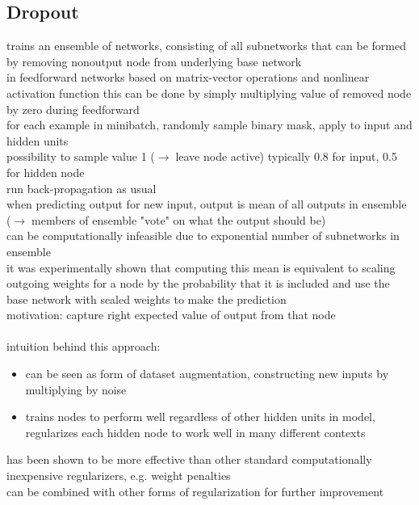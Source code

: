 \documentclass{article}
\newcommand{\arrow}{$\rightarrow\;$}
\begin{document}
\subsection{Dropout}
trains an ensemble of networks, consisting of all subnetworks that can be formed by removing nonoutput node from underlying base network \\
in feedforward networks based on matrix-vector operations and nonlinear activation function this can be done by simply multiplying value of removed node by zero during feedforward \\
for each example in minibatch, randomly sample binary mask, apply to input and hidden units \\
possibility to sample value 1 (\arrow leave node active) typically 0.8 for input, 0.5 for hidden node \\
run back-propagation as usual \\
when predicting output for new input, output is mean of all outputs in ensemble (\arrow members of ensemble "vote" on what the output should be) \\
can be computationally infeasible due to exponential number of subnetworks in ensemble \\
it was experimentally shown that computing this mean is equivalent to scaling outgoing weights for a node by the probability that it is included and use the base network with scaled weights to make the prediction \\
motivation: capture right expected value of output from that node\\
\\
intuition behind this approach:
\begin{itemize}
    \item can be seen as form of dataset augmentation, constructing new inputs by multiplying by noise
    \item trains nodes to perform well regardless of other hidden units in model, regularizes each hidden node to work well in many different contexts
\end{itemize}
has been shown to be more effective than other standard computationally inexpensive regularizers, e.g. weight penalties \\
can be combined with other forms of regularization for further improvement
\end{document}
